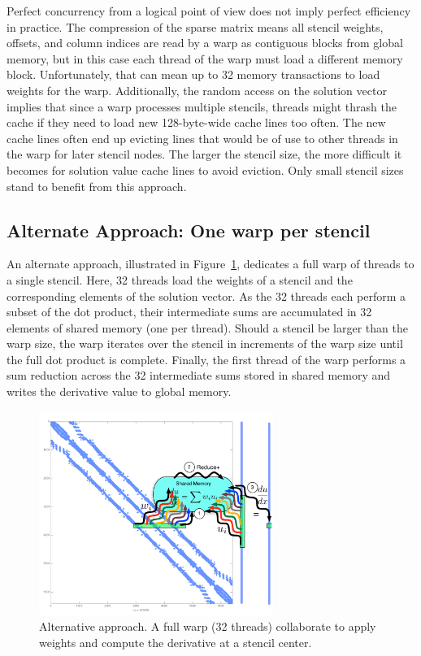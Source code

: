 \documentclass{report}
\begin{document}
Perfect concurrency from a logical point of view does not 
imply perfect efficiency in practice. The compression of the sparse matrix means all stencil weights, offsets, and column indices are read by a warp as contiguous blocks from global memory, but in this case each thread of the warp must load a different memory block. Unfortunately, that can mean up to 32 memory transactions to load weights for the warp. Additionally, the random access on the solution vector implies that since a warp processes multiple stencils, threads might thrash the cache if they need to load new 128-byte-wide cache lines too often. The new cache lines often end up evicting lines that would be of use to other threads in the warp for later stencil nodes. The larger the stencil size, the more difficult it becomes for solution value cache lines to avoid eviction. Only small stencil sizes stand to benefit from this approach. 




\subsection{Alternate Approach: One warp per stencil} 

An alternate approach, illustrated in Figure~\ref{fig:oneWarpPerStencil}, dedicates a full warp of threads to a single stencil. Here, 32 threads load the weights of a stencil and the corresponding elements of the solution vector. As the 32 threads each perform a subset of the dot product, their intermediate sums are accumulated in 32 elements of shared memory (one per thread).
Should  a stencil be larger than the warp size, the warp iterates over the stencil in increments of the warp size until the full dot product is complete. Finally, the first thread of the warp performs a sum reduction across the 32 intermediate sums stored in shared memory and writes the derivative value to global memory. 

\begin{figure}[ht]
      \centering
       \includegraphics[width=3in]{../figures/paper1/figures/omnigraffle/oneWarpPerStencil.pdf}
      \caption{Alternative approach. A full warp (32 threads) collaborate to apply weights  and compute the derivative at a stencil center. }
      \label{fig:oneWarpPerStencil}
\end{figure}
\end{document}
